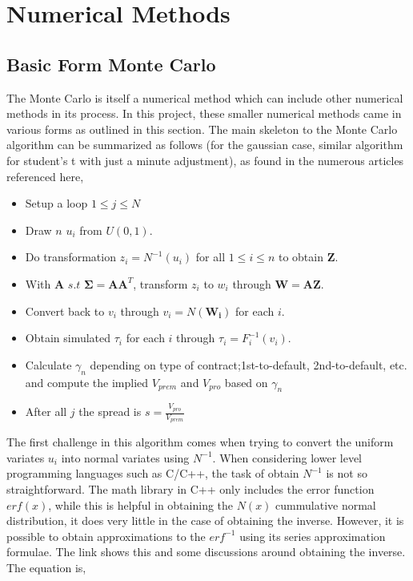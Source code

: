\documentclass[a4paper,12pt]{article}
\begin{document}
\section{Numerical Methods}
\subsection{Basic Form Monte Carlo}
The Monte Carlo is itself a numerical method which can include other numerical methods in its process. In this project, these smaller numerical methods came in various forms as outlined in this section. The main skeleton to the Monte Carlo algorithm can be summarized as follows (for the gaussian case, similar algorithm for student's t with just a minute adjustment), as found in the numerous articles referenced here, 

\begin{itemize}
\item Setup a loop $1 \leq j \leq N$
\item Draw $n$ $u_i$ from $U(0, 1)$.
\item Do transformation $z_i = N^{-1}(u_i)$ for all $1 \leq i \leq n$ to obtain $\mathbf{Z}$.
\item With $\mathbf{A}$ $s.t $ $\mathbf{\Sigma} = \mathbf{A}\mathbf{A}^T$, transform $z_i$ to $w_i$ through $\mathbf{W} = \mathbf{A}\mathbf{Z}$.
\item Convert back to $v_i$ through $v_i = N(\mathbf{W_i})$ for each $i$.
\item Obtain simulated $\tau_i$ for each $i$ through $\tau_i = F_i^{-1}(v_i)$. 
\item Calculate $\gamma_n$ depending on type of contract;1st-to-default, 2nd-to-default, etc. and compute the implied $V_{prem}$ and $V_{pro}$ based on $\gamma_n$
\item After all $j$ the spread is $s= \frac{V_{pro}}{V_{prem}}$
\end{itemize}

The first challenge in this algorithm comes when trying to convert the uniform variates $u_i$ into normal variates using $N^{-1}$. When considering lower level programming languages such as C/C++, the task of obtain $N^{-1}$ is not so straightforward. The math library in C++ only includes the error function $erf(x)$, while this is helpful in obtaining the $N(x)$ cummulative normal distribution, it does very little in the case of obtaining the inverse. However, it is possible to obtain approximations to the $erf^{-1}$ using its series approximation formulae.  The link \cite{mimirgames} shows this and some discussions around obtaining the inverse. The equation is, 
\end{document}
